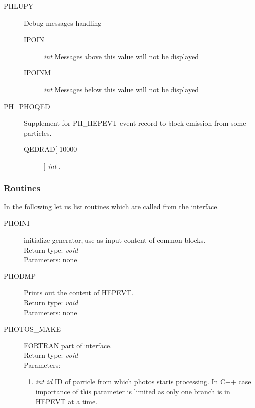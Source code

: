 \documentclass[]{Photos_interface_design}
\begin{document}
\begin{description}
\item[PHLUPY] Debug messages handling
    \begin{description}
    \item[IPOIN]  \textit{int} Messages above this value will not be displayed
	\item[IPOINM] \textit{int} Messages below this value will not be displayed
    \end{description}
\end{description}

\begin{description}
\item[PH\_PHOQED] Supplement for PH\_HEPEVT event record to block emission 
from some particles.
    \begin{description}
    \item[QEDRAD[ 10000]]  \textit{int} .
    \end{description}
\end{description}

\subsubsection{Routines}

In the following let us list routines which are called from the interface.

\begin{description}
\item[PHOINI] initialize generator, use as input content of common blocks. \\
  Return type: \textit{void} \\
  Parameters: none
\end{description}

\begin{description}
\item[PHODMP] Prints out the content of HEPEVT. \\
  Return type: \textit{void} \\
  Parameters: none
\end{description}

\begin{description}
\item[PHOTOS\_MAKE] FORTRAN part of interface. \\
  Return type: \textit{void} \\
  Parameters:
  \begin{enumerate}
    \item \textit {int id} ID of particle from which photos starts processing. In C++ case importance of this parameter is limited as only one branch is in HEPEVT at a time.
  \end{enumerate}
\end{description}
\end{document}
